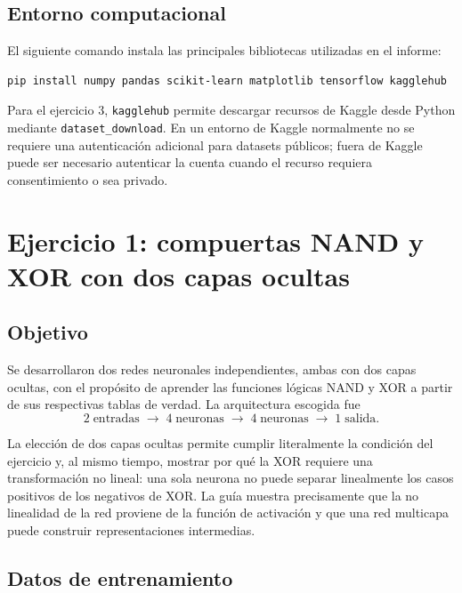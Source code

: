 \documentclass[14pt,twoside]{article}
\begin{document}
\subsection{Entorno computacional}

El siguiente comando instala las principales bibliotecas utilizadas en el informe:

\begin{lstlisting}[style=pgterminal,caption={Instalación del entorno de trabajo.}]
pip install numpy pandas scikit-learn matplotlib tensorflow kagglehub
\end{lstlisting}

Para el ejercicio 3, \texttt{kagglehub} permite descargar recursos de Kaggle desde Python mediante \texttt{dataset\_download}. En un entorno de Kaggle normalmente no se requiere una autenticación adicional para datasets públicos; fuera de Kaggle puede ser necesario autenticar la cuenta cuando el recurso requiera consentimiento o sea privado. \cite{kagglehub}

\section{Ejercicio 1: compuertas NAND y XOR con dos capas ocultas}

\subsection{Objetivo}

Se desarrollaron dos redes neuronales independientes, ambas con dos capas ocultas, con el propósito de aprender las funciones lógicas NAND y XOR a partir de sus respectivas tablas de verdad. La arquitectura escogida fue
\[
2\;\text{entradas}\;\longrightarrow\;4\;\text{neuronas}\;\longrightarrow\;4\;\text{neuronas}\;\longrightarrow\;1\;\text{salida}.
\]

La elección de dos capas ocultas permite cumplir literalmente la condición del ejercicio y, al mismo tiempo, mostrar por qué la XOR requiere una transformación no lineal: una sola neurona no puede separar linealmente los casos positivos de los negativos de XOR. La guía muestra precisamente que la no linealidad de la red proviene de la función de activación y que una red multicapa puede construir representaciones intermedias. \cite{martinez2026}

\subsection{Datos de entrenamiento}
\end{document}
